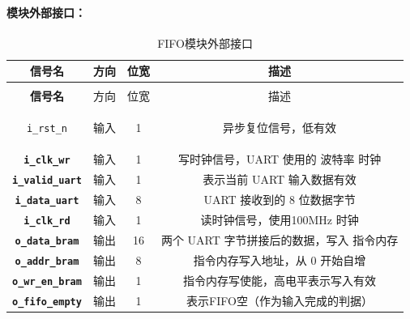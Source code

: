 \documentclass[lang=cn,a4paper,newtx]{elegantpaper}
\begin{document}
\paragraph{模块外部接口：}
\begin{longtable}{>{\bfseries}c c c c}
  \caption{FIFO模块外部接口} \\
  \toprule
  信号名 & 方向 & 位宽 & 描述 \\
  \midrule
  \endfirsthead

  \multicolumn{4}{l}{\textbf{（续表）FIFO模块外部接口}} \\
  \toprule
  信号名 & 方向 & 位宽 & 描述 \\
  \midrule
  \endhead

  \texttt{i\_rst\_n}         & 输入  & 1        & 异步复位信号，低有效 \\
  \texttt{i\_clk\_wr}        & 输入  & 1        & 写时钟信号，UART 使用的 波特率 时钟 \\
  \texttt{i\_valid\_uart}    & 输入  & 1        & 表示当前 UART 输入数据有效 \\
  \texttt{i\_data\_uart}     & 输入  & 8        & UART 接收到的 8 位数据字节 \\
  \texttt{i\_clk\_rd}        & 输入  & 1        & 读时钟信号，使用100MHz 时钟 \\
  \texttt{o\_data\_bram}     & 输出  & 16       & 两个 UART 字节拼接后的数据，写入 指令内存 \\
  \texttt{o\_addr\_bram}     & 输出  & 8        & 指令内存写入地址，从 0 开始自增 \\
  \texttt{o\_wr\_en\_bram}   & 输出  & 1        & 指令内存写使能，高电平表示写入有效 \\
  \texttt{o\_fifo\_empty}    & 输出   & 1       & 表示FIFO空（作为输入完成的判据）\\
  \bottomrule
\end{longtable}
\end{document}
